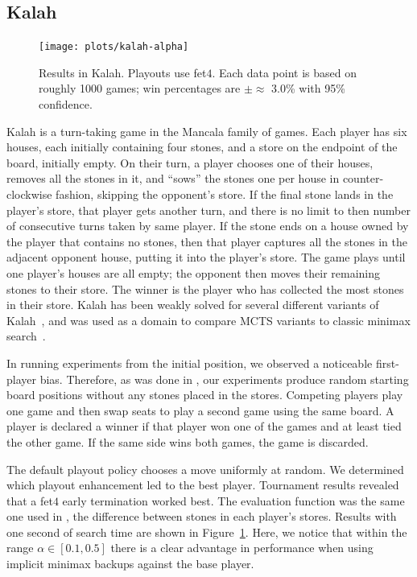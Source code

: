 \documentclass[conference]{IEEEtran}
\begin{document}
\subsection{Kalah}

\begin{figure}
\begin{center}
\texttt{[image: plots/kalah-alpha]}
\caption{Results in Kalah. Playouts use fet$4$. Each data point is based on roughly 1000 
games; win percentages are $\pm \approx$ 3.0\% with 95\% confidence.}
\label{fig:kalah-alpha}
\end{center}
\end{figure}

Kalah is a turn-taking game in the Mancala family of games. Each player has six houses, each 
initially containing four stones, and a store on the endpoint of the board, initially empty. 
On their turn, a player chooses one of their houses, removes all the stones in it, and ``sows'' 
the stones one per house in counter-clockwise fashion, skipping the opponent's store. 
If the final stone lands in the player's store, that player gets another turn, and there is no 
limit to then number of consecutive turns taken by same player. If the stone ends on a house owned
by the player that contains no stones, then that player captures all the stones in the adjacent 
opponent house, putting it into the player's store. The game plays until one player's houses are
all empty; the opponent then moves their remaining stones to their store. The winner is the player
who has collected the most stones in their store. 
Kalah has been weakly solved for several different variants of Kalah~\cite{Irving00Solving}, 
and was used as a domain to compare MCTS variants to classic minimax search~\cite{Ramanujan11Tradeoffs}.

In running experiments from the initial position, we observed a noticeable first-player bias. Therefore, as
was done in \cite{Ramanujan11Tradeoffs}, our experiments produce random starting board positions 
without any stones placed in the stores. 
Competing players play one game and then swap seats to play a second game using the same board. A player 
is declared a winner if that player won one of the games and at least tied the other game. If the same side 
wins both games, the game is discarded. 

The default playout policy chooses a move uniformly at random. 
We determined which playout enhancement led to the best player. 
Tournament results revealed that a fet$4$ early termination worked best. 
The evaluation function was the same one used in \cite{Ramanujan11Tradeoffs}, the difference between stones
in each player's stores. Results with one 
second of search time are shown in Figure~\ref{fig:kalah-alpha}. 
Here, we notice that within the range $\alpha \in [0.1,0.5]$ there is a clear 
advantage in performance when using implicit minimax backups against the base player. 
\end{document}
